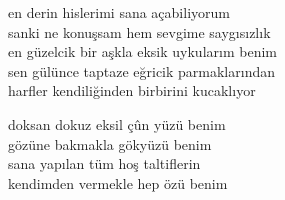 \documentclass[10pt, openright, oneside]{memoir}
\theoremstyle{definition}
\begin{document}
\vspace*{\fill}
%
\newpage
{}
\vspace*{\fill}
\settowidth{\versewidth}{en güzelcik bir aşkla eksik uykularım benim}
\begin{cverse}
  en derin hislerimi sana açabiliyorum \\
  sanki ne konuşsam hem sevgime saygısızlık \\
  en güzelcik bir aşkla eksik uykularım benim \\
  sen gülünce taptaze eğricik parmaklarından \\
  harfler kendiliğinden birbirini kucaklıyor \\
\end{cverse}
\vspace*{\fill}
%
\newpage
{}
\vspace*{\fill}
\settowidth{\versewidth}{doksan dokuz eksil çûn yüzü benim}
\begin{cverse}
  doksan dokuz eksil çûn yüzü benim \\
  gözüne bakmakla gökyüzü benim \\
  sana yapılan tüm hoş taltiflerin \\
  kendimden vermekle hep özü benim \\
\end{cverse}
\vspace*{\fill}
%
\newpage
{}
\vspace*{\fill}
\settowidth{\versewidth}{var dersen eğer iğne ipliğe bunlardan bahsedersen}
\end{document}
